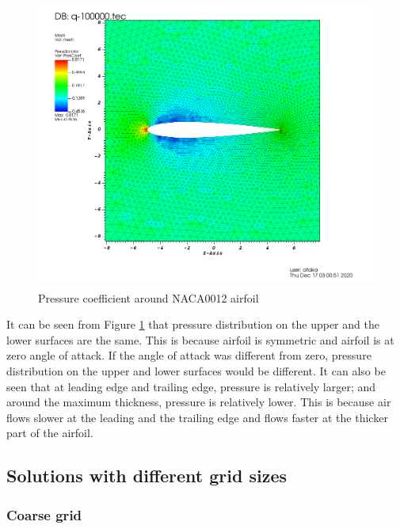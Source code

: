 \documentclass[letterpaper,12pt]{article}
\begin{document}
\begin{figure} [!h]
	\centering
	\includegraphics[height = 9.5cm]{graph/medium/medium_pressure0000.png}
	\caption{Pressure coefficient around NACA0012 airfoil}
    \label{fig:airfoilpressure}
\end{figure}

\vspace{1cm}

It can be seen from Figure \ref{fig:airfoilpressure} that pressure distribution on the upper and the lower surfaces are the same.
This is because airfoil is symmetric and airfoil is at zero angle of attack. If the angle of attack was different from zero, 
pressure distribution on the upper and lower surfaces would be different. It can also be seen that at leading edge and trailing edge,
pressure is relatively larger; and around the maximum thickness, pressure is relatively lower. This is because air flows slower at the 
leading and the trailing edge and flows faster at the thicker part of the airfoil.

\newpage

\subsection{Solutions with different grid sizes}

\subsubsection{Coarse grid}
\end{document}
